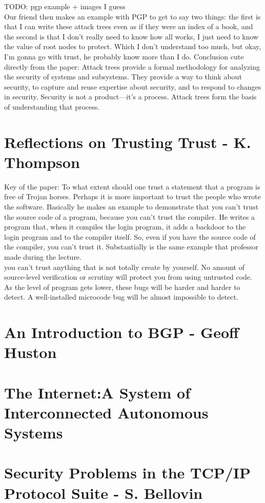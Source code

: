 TODO: pgp example + images I guess
\\
Our friend then makes an example with PGP to get to say two things: the first is that I can write these attack trees even as if they were an index of a book, and the second is that I don’t really need to know how all works, I just need to know the value of root nodes to protect. Which I don’t understand too much, but okay, I’m gonna go with trust, he probably know more than I do.
Conclusion cute directly from the paper:  
Attack trees provide a formal methodology for analyzing the security of systems and subsystems.
They provide a way to think about security, to capture and reuse expertise about security, and to
respond to changes in security. Security is not a product—it’s a process. Attack trees form the basis
of understanding that process.
\section{Reflections on Trusting Trust - K. Thompson}
Key of the paper: To what extent should one trust a statement that a program is free of Trojan horses. Perhaps it is more important to trust the people who wrote the software.
Basically he makes an example to demonstrate that you can't trust the source code of a program, because you can't trust the compiler. He writes a program that, when it compiles the login program, it adds a backdoor to the login program and to the compiler itself. So, even if you have the source code of the compiler, you can't trust it. Substantially is the same example that professor made during the lecture.
\\you can't trust anything that is not totally create by yourself. No amount of source-level verification or scrutiny will protect you from using untrusted code. As the level of program gets lower, these bugs will be harder and harder to detect. A well-installed microcode bug will be almost impossible to detect.
\section{An Introduction to BGP - Geoff Huston}
\section{The Internet:A System of Interconnected Autonomous Systems}
\section{Security Problems in the TCP/IP Protocol Suite - S. Bellovin}
